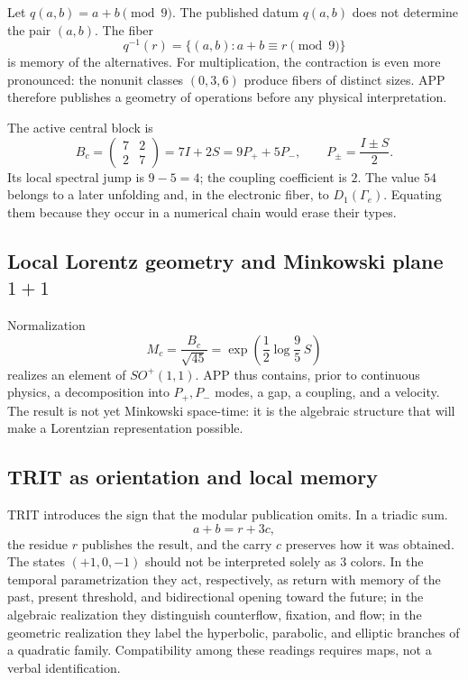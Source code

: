 Let \(q(a,b)=a+b\pmod 9\). The published datum \(q(a,b)\) does not determine the pair
\((a,b)\). The fiber
\[
 q^{-1}(r)=\{(a,b):a+b\equiv r\pmod9\}
\]
is memory of the alternatives. For multiplication, the contraction is even
more pronounced: the nonunit classes \((0,3,6)\) produce fibers of distinct
sizes. APP therefore publishes a geometry of operations before
any physical interpretation.

The active central block is
\[
B_c=\begin{pmatrix}7&2\\2&7\end{pmatrix}
   =7I+2S=9P_++5P_-,
\qquad
P_\pm=\frac{I\pm S}{2}.
\]
Its local spectral jump is \(9-5=4\); the coupling coefficient is \(2\).
The value \(54\) belongs to a later unfolding and, in the electronic fiber,
to \(D_1(\Gamma_e)\). Equating them because they occur in a numerical chain would erase
their types.

\subsection{Local Lorentz geometry and Minkowski plane \texorpdfstring{\(1+1\)}{1+1}}

Normalization
\[
M_c=\frac{B_c}{\sqrt{45}}
=\exp\!\left(\frac12\log\frac95\,S\right)
\]
realizes an element of \(SO^+(1,1)\). APP thus contains, prior to continuous
physics, a decomposition into \(P_+,P_-\) modes, a gap, a coupling,
and a velocity. The result is not yet Minkowski space-time: it is
the algebraic structure that will make a Lorentzian representation possible.

\subsection{TRIT as orientation and local memory}

TRIT introduces the sign that the modular publication omits. In a triadic sum.
\[
 a+b=r+3c,
\]
the residue \(r\) publishes the result, and the carry \(c\) preserves how it was obtained. The states \((+1,0,-1)\) should not be interpreted solely as \(3\) colors. In the temporal parametrization they act, respectively, as return with memory of the past, present threshold, and bidirectional opening toward the future; in the algebraic realization they distinguish counterflow, fixation, and flow; in the geometric realization they label the hyperbolic, parabolic, and elliptic branches of a quadratic family. Compatibility among these readings requires maps, not a verbal identification.

